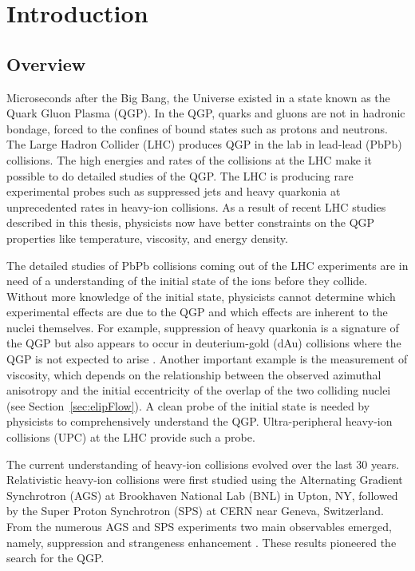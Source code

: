 \chapter{Introduction}
  \section{Overview}
  Microseconds after the Big Bang, the Universe existed in a state known as
    the Quark Gluon Plasma (QGP).
  In the QGP, quarks and gluons are not in hadronic bondage, forced to 
    the confines of bound states such as protons and neutrons.
  The Large Hadron Collider (LHC) produces QGP in the lab in lead-lead (PbPb)
    collisions.
  The high energies and rates of the collisions at the LHC make it possible 
    to do detailed studies of the QGP. 
  The LHC is producing rare experimental probes such as suppressed jets and 
    heavy quarkonia at unprecedented rates in heavy-ion collisions. 
  As a result of recent LHC studies described in this thesis, physicists now 
    have better constraints on the QGP properties like temperature, viscosity, 
    and energy density.

  The detailed studies of PbPb collisions coming out of the LHC 
    experiments are in need of a understanding of the initial state of the ions 
    before they collide.
  Without more knowledge of the initial state, physicists cannot determine 
    which experimental effects are due to the QGP and which effects are 
    inherent to the nuclei themselves. 
  For example, suppression of heavy quarkonia is a signature of the QGP 
    but also appears to occur in deuterium-gold (dAu) collisions where the QGP 
    is not expected to arise \cite{dAuOniaPHENIX}. 
  Another important example is the measurement of viscosity, which depends on 
    the relationship between the observed azimuthal anisotropy and the 
    initial eccentricity of the overlap of the two colliding nuclei 
    (see Section~\ref{sec:elipFlow}). 
  A clean probe of the initial state is needed by physicists to comprehensively 
    understand the QGP.
  Ultra-peripheral heavy-ion collisions (UPC) at the LHC provide such a probe.

  The current understanding of heavy-ion collisions evolved over the
    last 30 years.
  Relativistic heavy-ion collisions were first studied using the 
    Alternating Gradient Synchrotron (AGS) at Brookhaven National Lab (BNL) 
    in Upton, NY, followed by the Super Proton Synchrotron (SPS) at CERN near 
    Geneva, Switzerland. 
  From the numerous AGS and SPS experiments two main observables emerged,
    namely, \JPsi{} suppression and strangeness enhancement \cite{sps}. 
  These results pioneered the search for the QGP. 

